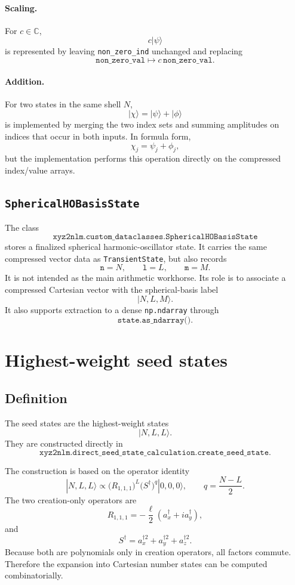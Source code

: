 \documentclass[11pt]{article}
\begin{document}
\paragraph{Scaling.}
For \(c\in\mathbb C\),
\[
    c|\psi\rangle
\]
is represented by leaving \texttt{non\_zero\_ind} unchanged and replacing
\[
    \texttt{non\_zero\_val}
    \mapsto
    c\,\texttt{non\_zero\_val}.
\]

\paragraph{Addition.}
For two states in the same shell \(N\),
\[
    |\chi\rangle=|\psi\rangle+|\phi\rangle
\]
is implemented by merging the two index sets and summing amplitudes on
indices that occur in both inputs. In formula form,
\[
    \chi_j=\psi_j+\phi_j,
\]
but the implementation performs this operation directly on the compressed
index/value arrays.

\subsection{\texttt{SphericalHOBasisState}}

The class
\[
    \texttt{xyz2nlm.custom\_dataclasses.SphericalHOBasisState}
\]
stores a finalized spherical harmonic-oscillator state. It carries the same
compressed vector data as \texttt{TransientState}, but also records
\[
    \texttt{n}=N,\qquad
    \texttt{l}=L,\qquad
    \texttt{m}=M .
\]
It is not intended as the main arithmetic workhorse. Its role is to associate
a compressed Cartesian vector with the spherical-basis label
\[
    |N,L,M\rangle .
\]
It also supports extraction to a dense \texttt{np.ndarray} through
\[
    \texttt{state.as\_ndarray()}.
\]

\section{Highest-weight seed states}

\subsection{Definition}

The seed states are the highest-weight states
\[
    |N,L,L\rangle .
\]
They are constructed directly in
\[
    \texttt{xyz2nlm.direct\_seed\_state\_calculation.create\_seed\_state}.
\]

The construction is based on the operator identity
\[
    |N,L,L\rangle
    \propto
    \bigl(R_{1,1,1}\bigr)^L
    \bigl(S^\dagger\bigr)^q
    |0,0,0\rangle ,
    \qquad
    q=\frac{N-L}{2}.
\]
The two creation-only operators are
\[
    R_{1,1,1}
    =
    -\frac{\ell}{2}
    \left(a_x^\dagger+i a_y^\dagger\right),
\]
and
\[
    S^\dagger
    =
    a_x^{\dagger 2}
    +
    a_y^{\dagger 2}
    +
    a_z^{\dagger 2}.
\]
Because both are polynomials only in creation operators, all factors commute.
Therefore the expansion into Cartesian number states can be computed
combinatorially.
\end{document}
